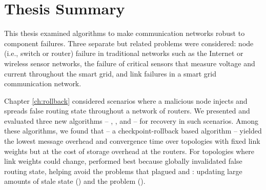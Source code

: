 \section{Thesis Summary}
\label{sec:thesis-summary}

This thesis examined algorithms to make communication networks robust to component failures. %
Three separate but related problems were considered: node (i.e., switch or router) failure in traditional networks such as the Internet or wireless sensor networks,
the failure of critical sensors that measure voltage and current throughout the smart grid, and link failures in a smart grid communication network.

Chapter \ref{ch:rollback} considered scenarios where a malicious node injects and spreads false routing state throughout a network of routers.
We presented and evaluated three new algorithms -- \seconds, \purges, and \cpr -- for recovery in such scenarios. %
Among these algorithms, we found that \cpr -- a checkpoint-rollback based algorithm -- yielded the lowest message overhead and convergence time over topologies
with fixed link weights but at the cost of storage overhead at the routers.
For topologies where link weights could change, \purge performed best because \purge globally invalidated false routing state, helping \purge avoid the problems that 
plagued \cpr and \seconds: updating large amounts of stale state (\cprs) and the \infinity problem (\seconds).


